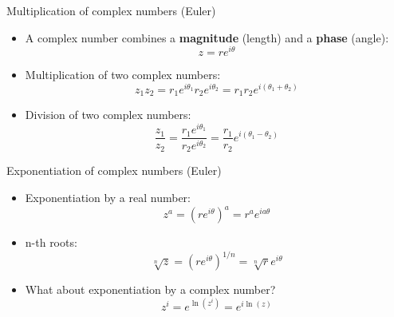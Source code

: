 \documentclass[aspectratio=169,12pt]{beamer}
\begin{document}
\begin{frame}{Multiplication of complex numbers (Euler)}

  \begin{center}
  \begin{itemize}
    \item A complex number combines a \textbf{magnitude} (length) and a \textbf{phase} (angle):
    \begin{equation*}
      z = r e^{i\theta}
    \end{equation*}
    \item Multiplication of two complex numbers:
    \begin{equation*}
      z_1 z_2 = r_1 e^{i\theta_1} r_2 e^{i\theta_2} = r_1 r_2 e^{i(\theta_1+\theta_2)}
    \end{equation*}
    \item Division of two complex numbers:
    \begin{equation*}
      \frac{z_1}{z_2} = \frac{r_1 e^{i\theta_1}}{r_2 e^{i\theta_2}} = \frac{r_1}{r_2} e^{i(\theta_1-\theta_2)}
    \end{equation*}
  \end{itemize}
  \end{center}

\end{frame}

\begin{frame}{Exponentiation of complex numbers (Euler)}

  \begin{center}
  \begin{itemize}
    \item Exponentiation by a real number:
    \begin{equation*}
      z^a = \left( r e^{i\theta} \right)^a = r^a e^{ia\theta}
    \end{equation*}
    \item n-th roots:
    \begin{equation*}
      \sqrt[n]{z} = \left( r e^{i\theta} \right) ^{1/n} = \sqrt[n]{r} e^{i\theta}
    \end{equation*}
    \bigskip
    \item What about exponentiation by a complex number?
    \begin{equation*}
      z^i = e^{\ln(z^i)} = e^{i\ln(z)}
    \end{equation*}
  \end{itemize}
  \end{center}

\end{frame}
\end{document}
